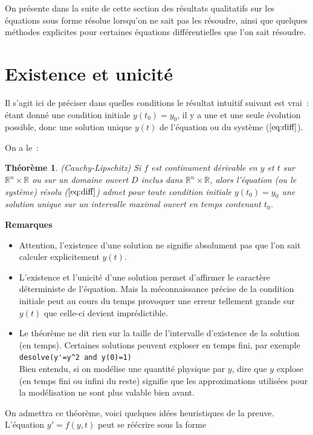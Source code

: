 \documentclass[a4paper,11pt]{book}
\newtheorem{thm}{Théorème}
\begin{document}
\begin{giacjshere}
On pr\'esente dans la suite de cette section 
des r\'esultats qualitatifs sur les \'equations sous forme r\'esolue
lorsqu'on ne sait pas les r\'esoudre, ainsi que 
quelques m\'ethodes explicites
pour certaines \'equations diff\'erentielles que l'on sait
r\'esoudre.

\section{Existence et unicit\'e} \label{sec:existence}
Il s'agit ici de pr\'eciser dans quelles conditions le r\'esultat
intuitif suivant est vrai~: \'etant donn\'e une condition initiale
$y(t_0)=y_0$, il y a une et une seule \'evolution possible, donc
une solution unique $y(t)$ de l'\'equation ou du syst\`eme
(\(\ref{eq:diff}\)).

On a le~:
\begin{thm} \label{thm:eqdiff} (Cauchy-Lipschitz)
Si $f$ est continument d\'erivable en $y$ et $t$ sur $\mathbb{R}^n \times \mathbb{R}$
ou sur un domaine ouvert $D$ inclus dans $\mathbb{R}^n \times \mathbb{R}$, alors l'\'equation
(ou le syst\`eme) r\'esolu (\(\ref{eq:diff}\)) admet pour toute condition
initiale $y(t_0)=y_0$ une solution unique
sur un intervalle maximal ouvert en temps contenant $t_0$.
\end{thm}
{\bf Remarques}
\begin{itemize}
\item
Attention, l'existence d'une solution ne signifie absolument pas que
l'on sait calculer explicitement $y(t)$.
\item
L'existence et l'unicit\'e d'une solution permet d'affirmer le
caract\`ere d\'eterministe de l'\'equation. Mais la m\'econnaissance
pr\'ecise de la condition initiale peut au cours du temps
provoquer une erreur tellement grande sur $y(t)$
que celle-ci devient impr\'edictible.
\item Le th\'eor\`eme ne dit rien sur la taille de l'intervalle
d'existence de la solution (en temps). Certaines solutions
peuvent exploser en temps fini, par exemple\\
\verb|desolve(y'=y^2 and y(0)=1)|\\
Bien entendu, si on mod\'elise une quantit\'e physique par $y$, dire
que $y$ explose (en temps fini ou infini du reste)
signifie que les approximations utilis\'ees pour la mod\'elisation
ne sont plus valable bien avant.
\end{itemize}
On admettra ce th\'eor\`eme, voici quelques id\'ees heuristiques
de la preuve. L'\'equation $y'=f(y,t)$ peut se r\'e\'ecrire sous la forme

\end{giacjshere}
\end{document}
